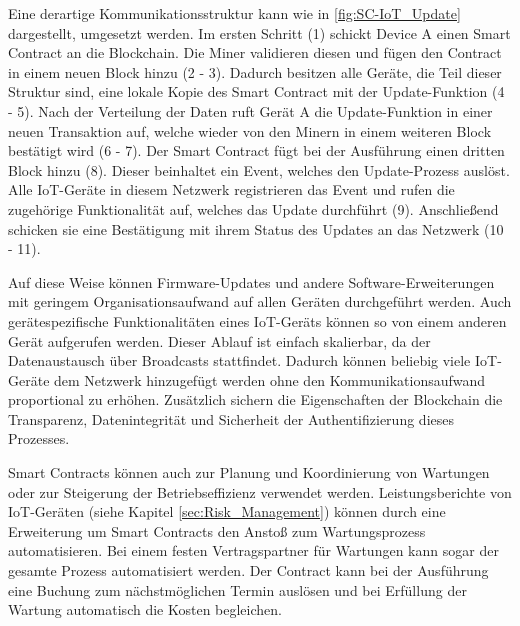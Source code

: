 Eine derartige Kommunikationsstruktur kann wie in \autoref{fig:SC-IoT_Update} dargestellt, umgesetzt werden.
Im ersten Schritt (1) schickt Device A einen Smart Contract an die Blockchain. Die Miner validieren diesen
und fügen den Contract in einem neuen Block hinzu (2 - 3). Dadurch besitzen alle Geräte, die Teil dieser 
Struktur sind, eine lokale Kopie des Smart Contract mit der Update-Funktion (4 - 5).
Nach der Verteilung der Daten ruft Gerät A die Update-Funktion in einer neuen Transaktion auf, welche 
wieder von den Minern in einem weiteren Block bestätigt wird (6 - 7). 
Der Smart Contract fügt bei der Ausführung einen dritten Block hinzu (8). Dieser beinhaltet ein Event,
welches den Update-Prozess auslöst.
Alle IoT-Geräte in diesem Netzwerk registrieren das Event und rufen die zugehörige Funktionalität auf, 
welches das Update durchführt (9). 
Anschließend schicken sie eine Bestätigung mit ihrem Status des Updates an das Netzwerk (10 - 11).

Auf diese Weise können Firmware-Updates und andere Software-Erweiterungen mit geringem Organisationsaufwand auf allen 
Geräten durchgeführt werden. 
Auch gerätespezifische Funktionalitäten eines IoT-Geräts können so von einem anderen Gerät aufgerufen werden.
Dieser Ablauf ist einfach skalierbar, da der Datenaustausch über Broadcasts stattfindet.  
Dadurch können beliebig viele IoT-Geräte dem Netzwerk hinzugefügt werden ohne den Kommunikationsaufwand 
proportional zu erhöhen. 
Zusätzlich sichern die Eigenschaften der Blockchain die Transparenz, Datenintegrität und Sicherheit der
Authentifizierung dieses Prozesses.
\cite[p.~74f]{Choi2018DeviceControl}


Smart Contracts können auch zur Planung und Koordinierung von Wartungen oder zur Steigerung der 
Betriebseffizienz verwendet werden.
Leistungsberichte von IoT-Geräten (siehe Kapitel \ref{sec:Risk_Management}) können durch eine Erweiterung um 
Smart Contracts den Anstoß zum Wartungsprozess automatisieren.
Bei einem festen Vertragspartner für Wartungen kann sogar der gesamte Prozess automatisiert 
werden. 
Der Contract kann bei der Ausführung eine Buchung zum nächstmöglichen Termin auslösen und bei Erfüllung 
der Wartung automatisch die Kosten begleichen.
\cite[p.~169ff]{chowdhary2025smart}


